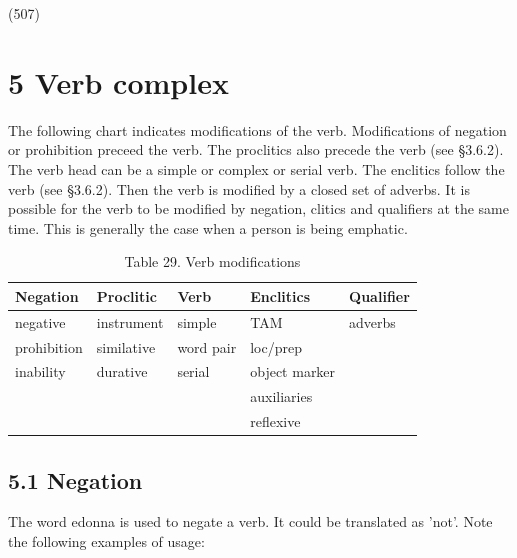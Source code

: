 \documentclass[10pt]{article}
\begin{document}
(507)

\section*{5 Verb complex}
The following chart indicates modifications of the verb. Modifications of negation or prohibition preceed the verb. The proclitics also precede the verb (see §3.6.2). The verb head can be a simple or complex or serial verb. The enclitics follow the verb (see §3.6.2). Then the verb is modified by a closed set of adverbs. It is possible for the verb to be modified by negation, clitics and qualifiers at the same time. This is generally the case when a person is being emphatic.

\begin{table}[h]
\begin{center}
\captionsetup{labelformat=empty}
\caption{Table 29. Verb modifications}
\begin{tabular}{|l|l|l|l|l|}
\hline
Negation & Proclitic & Verb & Enclitics & Qualifier \\
\hline
negative & instrument & simple & TAM & adverbs \\
\hline
prohibition & similative & word pair & loc/prep &  \\
\hline
inability & durative & serial & object marker &  \\
\hline
 &  &  & auxiliaries &  \\
\hline
 &  &  & reflexive &  \\
\hline
\end{tabular}
\end{center}
\end{table}

\subsection*{5.1 Negation}
The word edonna is used to negate a verb. It could be translated as 'not'. Note the following examples of usage:
\end{document}
